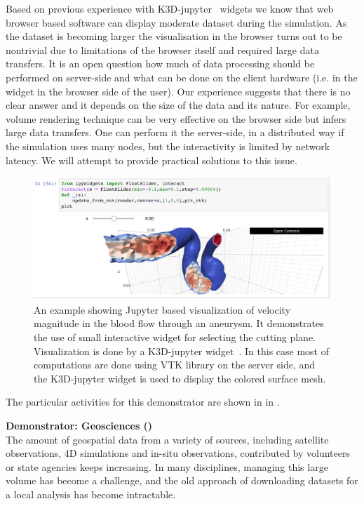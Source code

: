 Based on previous experience with K3D-jupyter~\cite{K3D}
widgets we know that web browser based software can display moderate
dataset during the simulation. As the dataset is becoming larger the
visualisation in the browser turns out to be nontrivial due to
limitations of the browser itself and required large data transfers. It is
an open question how much of data processing should be performed on
server-side and what can be done on the client hardware (i.e. in the
widget in the browser side of the user). Our
experience suggests that there is no clear answer and it depends on
the size of the data and its nature. For example, volume rendering
technique can be very effective on the browser side but infers large data
transfers. One can perform it the server-side, in a distributed way if
the simulation uses many nodes, but the interactivity is limited by
network latency. We will attempt to provide practical
solutions to this issue.
%
  \begin{figure}[ht!]\centering
  \includegraphics[width=.95\textwidth]{images/k3d_cfd.png}
  \caption{An example showing Jupyter based visualization of velocity
    magnitude in the blood flow through an aneurysm. It demonstrates
    the use of small interactive widget for selecting the cutting
    plane.
    Visualization is done by a K3D-jupyter widget~\cite{K3D}.
    In this case most of computations are done using VTK library on
    the server side, and the K3D-jupyter widget is used to display the
    colored surface mesh.
  }\label{fig:k3d-cfd}
  \end{figure}

    The particular activities for this demonstrator are shown in
   in .

\medskip
\noindent\textbf{Demonstrator: Geosciences ()}\label{sec:concept-demonstrators-geo}\\
The amount of geospatial data from a variety of sources, including satellite observations, 4D simulations and in-situ observations, contributed by volunteers
or state agencies keeps increasing. In many disciplines, managing this large volume
has become a challenge, and the old approach of downloading datasets for a local
analysis has become intractable.

